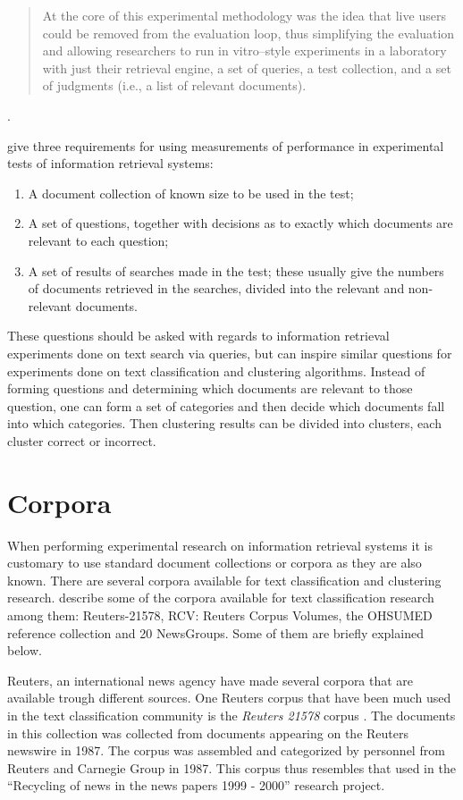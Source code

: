\begin{quote}
At the core of this experimental methodology was the idea that live users could be removed from the evaluation loop, thus simplifying the evaluation and allowing researchers to run in vitro–style experiments in a laboratory with just their retrieval engine, a set of queries, a test collection, and a set of judgments (i.e., a list of relevant documents).
\end{quote}.

\cite[p. 33]{Cleverdon1966} give three requirements for using measurements of performance in experimental tests of information retrieval systems:
\begin{enumerate}
\item A document collection of known size to be used in the test;
\item A set of questions, together with decisions as to exactly which documents are relevant to each question;
\item A set of results of searches made in the test; these usually give the numbers of documents retrieved in the searches, divided into the relevant and non-relevant documents.
\end{enumerate}
These questions should be asked with regards to information retrieval experiments done on text search via queries, but can inspire similar questions for experiments done on text classification and clustering algorithms. Instead of forming questions and determining which documents are relevant to those question, one can form a set of categories and then decide which documents fall into which categories. Then clustering results can be divided into clusters, each cluster correct or incorrect.

\section{Corpora}
\label{Corpora}

When performing experimental research on information retrieval systems it is customary to use standard document collections or corpora as they are also known. There are several corpora available for text classification and clustering research. \cite{Baeza-Yates2011a} describe some of the corpora available for text classification research among them: Reuters-21578, RCV: Reuters Corpus Volumes, the OHSUMED reference collection and 20 NewsGroups. Some of them are briefly explained below.

Reuters, an international news agency have made several corpora that are available trough different sources. One Reuters corpus that have been much used in the text classification community is the \textit{Reuters 21578} corpus \cite{Lewis2004a}. The documents in this collection was collected from documents appearing on the Reuters newswire in 1987. The corpus was assembled and categorized by personnel from Reuters and Carnegie Group in 1987. This corpus thus resembles that used in the ``Recycling of news in the news papers 1999 - 2000'' research project.

